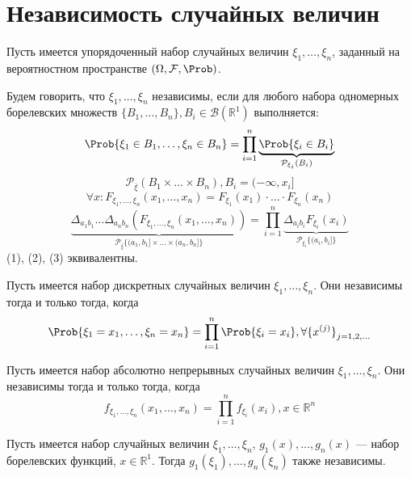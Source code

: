 \section{Независимость случайных величин}
Пусть имеется упорядоченный набор случайных величин $\xi_1, \ldots, \xi_n$, заданный на вероятностном пространстве $(\Omega, \mathcal{F}, \Prob)$.
\begin{definition}
	Будем говорить, что $\xi_1, \ldots, \xi_n$ независимы, если для любого набора одномерных борелевских множеств $\{ B_1, \ldots, B_n \}, B_i \in \mathcal{B}(\mathbb{R}^1)$ выполняется:
	\begin{equation}
		\Prob \{ \xi_1 \in B_1, \ldots, \xi_n \in B_n \} = \prod\limits_{i = 1}^n \underbrace{\Prob \{ \xi_i \in B_i \}}_{\mathcal{P}_{\xi_i}(B_i)}
	\end{equation}
	\[
		\mathcal{P}_{\overline{\xi}} (B_1 \times \ldots \times B_n), B_i = (-\infty, x_i]
	\]
	\begin{equation}
		\forall x: F_{\xi_1, \ldots, \xi_n} (x_1, \ldots, x_n) = F_{\xi_1} (x_1) \cdot \ldots \cdot F_{\xi_n} (x_n)
	\end{equation}
	\begin{equation}
		\underbrace{\Delta_{a_1 b_1} \ldots \Delta_{a_n b_n} (F_{\xi_1, \ldots, \xi_n} (x_1, \ldots, x_n))}_{\mathcal{P}_{ \overline{\xi}} \{ (a_1, b_1] \times \ldots \times (a_n, b_n] \} } =
		\prod\limits_{i = 1}^n \underbrace{ \Delta_{a_i b_i} F_{\xi_i} (x_i) }_{\mathcal{P}_{\xi_i} \{ (a_i, b_i] \}}
	\end{equation}
	(1), (2), (3) эквивалентны.
\end{definition}

\begin{theorem}
	Пусть имеется набор дискретных случайных величин $\xi_1, \ldots, \xi_n$. Они независимы тогда и только тогда, когда
	\[
		\Prob \{ \xi_1 = x_1, \ldots, \xi_n = x_n \} = \prod\limits_{i = 1}^n \Prob \{ \xi_i = x_i \}, \forall {\{ x^{(j)} \}}_{j = 1, 2, \ldots}
	\]
\end{theorem}

\begin{theorem}
	Пусть имеется набор абсолютно непрерывных случайных величин $\xi_1, \ldots, \xi_n$. Они независимы тогда и только тогда, когда
	\[
		f_{\xi_1, \ldots, \xi_n} (x_1, \ldots, x_n) = \prod\limits_{i = 1}^n f_{\xi_i} (x_i), x \in \mathbb{R}^n
	\]
\end{theorem}

\begin{addition}
	Пусть имеется набор случайных величин $\xi_1, \ldots, \xi_n$, $g_1 (x), \ldots, g_n(x)$ --- набор борелевских функций, $x \in \mathbb{R}^1$. Тогда $g_1(\xi_1), \ldots, g_n (\xi_n)$ также независимы.
\end{addition}

